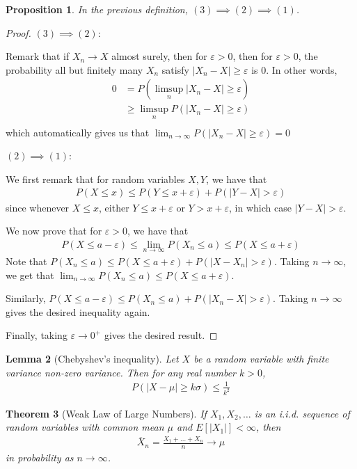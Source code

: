 \documentclass[11pt]{amsart}
\newtheorem{theorem}{Theorem}[section]
\newtheorem{lemma}[theorem]{Lemma}
\newtheorem{proposition}[theorem]{Proposition}
\theoremstyle{definition}
\numberwithin{equation}{section}
\begin{document}
\begin{proposition}
    In the previous definition, $(3)\implies(2)\implies(1)$.
\end{proposition}
\begin{proof}
    $(3)\implies(2)$:

    Remark that if $X_n\to X$ almost surely, then for $\varepsilon>0$, then for $\varepsilon>0$, the probability all but finitely many $X_n$ satisfy $|X_n-X|\ge\varepsilon$ is 0. In other words,
    \begin{align*}
        0&=P(\limsup_n |X_n-X|\ge\varepsilon)\\
        &\ge \limsup_nP(|X_n-X|\ge\varepsilon)\\
    \end{align*}
    which automatically gives us that $\displaystyle\lim_{n\to\infty}P(|X_n-X|\ge\varepsilon)=0$

    $(2)\implies(1)$:

    We first remark that for random variables $X,Y$, we have that
    \begin{align*}
        P(X\le x)\le P(Y\le x+\varepsilon)+P(|Y-X|>\varepsilon)
    \end{align*}
    since whenever $X\le x$, either $Y\le x+\varepsilon$ or $Y>x+\varepsilon$, in which case $|Y-X|>\varepsilon$.

    We now prove that for $\varepsilon>0$, we have that
    \begin{align*}
        P(X\le a-\varepsilon)\le\lim_{n\to\infty} P(X_n\le a)\le P(X\le a+\varepsilon)
    \end{align*}
    Note that $P(X_n\le a)\le P(X\le a+\varepsilon)+P(|X-X_n|>\varepsilon)$. Taking $n\to\infty$, we get that $\displaystyle\lim_{n\to\infty}P(X_n\le a)\le P(X\le a+\varepsilon)$.

    Similarly, $P(X\le a-\varepsilon)\le P(X_n\le a)+P(|X_n-X|>\varepsilon)$. Taking $n\to\infty$ gives the desired inequality again.

    Finally, taking $\varepsilon\to0^+$ gives the desired result.
\end{proof}
\begin{lemma}[Chebyshev's inequality]
    Let $X$ be a random variable with finite variance non-zero variance. Then for any real number $k>0$, 
    \begin{align*}
        P(|X-\mu|\ge k\sigma)\le\frac{1}{k^2}
    \end{align*}
\end{lemma}
\begin{theorem}[Weak Law of Large Numbers]
\label{wll}
    If $X_1,X_2,\ldots$ is an i.i.d. sequence of random variables with common mean $\mu$ and $E[|X_1|]<\infty$, then
    \begin{align*}
        \overline{X}_n=\frac{X_1+\ldots+X_n}{n}\to\mu
    \end{align*}
    in probability as $n\to\infty$.
\end{theorem}
\end{document}
